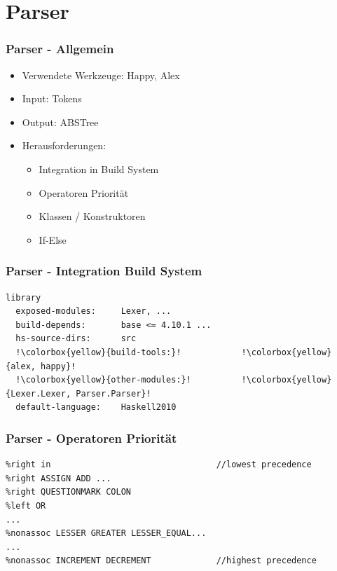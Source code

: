 \section{Parser}

\begin{frame}
	\frametitle{Parser - Allgemein}
	\begin{itemize}
		\item Verwendete Werkzeuge: Happy, Alex
		\item Input: Tokens
		\item Output: ABSTree
		\item Herausforderungen:
			\begin{itemize}
				\item Integration in Build System
				\item Operatoren Priorität
				\item Klassen / Konstruktoren
				\item If-Else
			\end{itemize}
	\end{itemize}
\end{frame}

\begin{frame}[fragile]
	\frametitle{Parser - Integration Build System}
	\begin{lstlisting}[escapechar=!]
library
  exposed-modules:     Lexer, ...
  build-depends:       base <= 4.10.1 ...
  hs-source-dirs:      src
  !\colorbox{yellow}{build-tools:}!            !\colorbox{yellow}{alex, happy}!
  !\colorbox{yellow}{other-modules:}!          !\colorbox{yellow}{Lexer.Lexer, Parser.Parser}!
  default-language:    Haskell2010
	\end{lstlisting}

\end{frame}

\begin{frame}[fragile]
	\frametitle{Parser - Operatoren Priorität}
	\begin{lstlisting}
%right in                                 //lowest precedence
%right ASSIGN ADD ...
%right QUESTIONMARK COLON
%left OR
...
%nonassoc LESSER GREATER LESSER_EQUAL...
...
%nonassoc INCREMENT DECREMENT             //highest precedence
	\end{lstlisting}
\end{frame}

